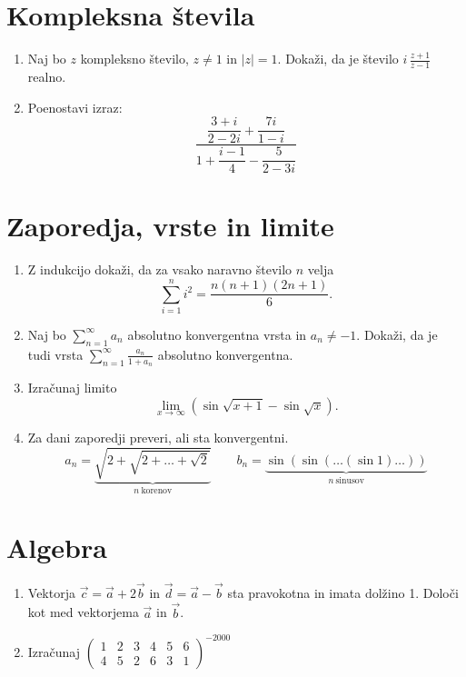 \documentclass[a4paper,12pt]{article}
\begin{document}
\section*{Kompleksna števila}

\begin{enumerate}
\item
Naj bo \(z\) kompleksno število, \(z \ne 1\) in \(|z| = 1\).
Dokaži, da je število \( i \, \frac{z+1}{z-1} \) realno.

\item
Poenostavi izraz:
\[
  \dfrac{\dfrac{3+i}{2-2i} + \dfrac{7i}{1-i}}{1 + \dfrac{i-1}{4} - \dfrac{5}{2-3i}}
\]
\end{enumerate}

\section*{Zaporedja, vrste in limite}

\begin{enumerate}
\item
Z indukcijo dokaži, da za vsako naravno število \(n\) velja
\[
  \sum_{i=1}^n i^2 = \frac{n(n+1)(2n+1)}{6}.
\]

\item
Naj bo \(\sum_{n=1}^\infty a_n\) absolutno konvergentna vrsta in \(a_n \ne -1\).
Dokaži, da je tudi vrsta \(\sum_{n=1}^\infty \frac{a_n}{1+a_n}\)
absolutno konvergentna.

\item
Izračunaj limito
\[
  \lim_{x \to \infty} (\sin \sqrt{x+1} - \sin \sqrt{x}).
\]

\item
Za dani zaporedji preveri, ali sta konvergentni.
\[
  a_n = \underbrace{\sqrt{2 + \sqrt{2 + \dots + \sqrt{2}}}}_{n~\text{korenov}}
  \qquad
  b_n = \underbrace{\sin(\sin(\dots(\sin 1)\dots))}_{n~\text{sinusov}}
\]
\end{enumerate}

\section*{Algebra}

\begin{enumerate}
\item
Vektorja \(\vec{c} = \vec{a} + 2\vec{b}\) in \(\vec{d} = \vec{a} - \vec{b}\)
sta pravokotna in imata dolžino 1. Določi kot med vektorjema \(\vec{a}\) in \(\vec{b}\).

\item
Izračunaj
\(\begin{pmatrix} 1 & 2 & 3 & 4 & 5 & 6 \\ 4 & 5 & 2 & 6 & 3 & 1 \end{pmatrix}^{-2000}\)
\end{enumerate}
\end{document}
